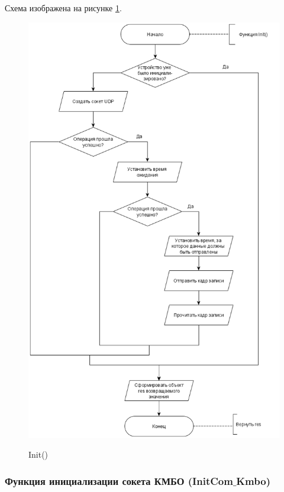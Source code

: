 	Схема изображена на рисунке \ref{fig14:image}.
	
	\begin{figure}[ph!]
		\centering
		\begin{center}
			{\includegraphics[scale=0.5]{schemes/init.png}}
			\caption{Init()}
			\label{fig14:image}
		\end{center}
	\end{figure}

	\subsubsection{Функция инициализации сокета КМБО (InitCom$\_$Kmbo)}
	
